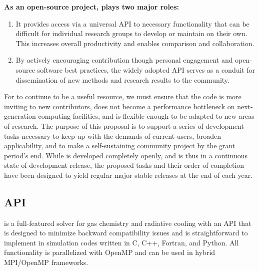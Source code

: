 \noindent
{\bf As an open-source project, \grackle{} plays two major roles:}
\begin{enumerate}
\item It provides access via a universal API to necessary functionality
that can be difficult for individual research groups to develop or
maintain on their own.  This increases overall productivity and
enables comparison and collaboration.
\item By actively encouraging contribution though personal engagement
and open-source software best practices, the widely adopted API serves
as a conduit for dissemination of new methods and research results to
the community.
\end{enumerate}
For \grackle{} to continue to be a useful resource, we must
ensure that the code is more inviting to new contributors, does not
become a performance bottleneck on next-generation computing facilities, 
and is flexible enough to be adapted to new areas of research.
The purpose of this proposal is to support a
series of development tasks necessary to keep up with the demands of
current users, broaden
applicability, and to make \grackle{} a
self-sustaining community project by the grant period's end.  While
\grackle{} is developed completely openly, and
is thus in a continuous state of development release, the proposed
tasks and their order of completion have been designed to yield
regular major stable releases at the end of each year.

\subsection{\grackle{} API}\label{sec:arch}

\grackle{} is a full-featured solver for gas chemistry and radiative
cooling with an API that is designed to minimize backward
compatibility issues and is straightforward to implement in simulation
codes written in C, C++, Fortran, and Python.  All functionality is
parallelized with OpenMP and can be used in hybrid MPI/OpenMP
frameworks.

